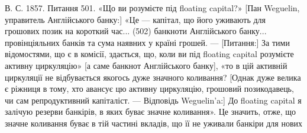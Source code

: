 В. С. 1857. Питання 501. «Що ви розумієте під floating capital?» [Пан
Weguelin, управитель Англійського банку:] «Це — капітал, що його уживають
для грошових позик на короткий час... (502) банкноти Англійського банку...
провінціяльних банків та сума наявних у країні грошей. — [Питання:] За тими
відомостями, що є в комісії, здається, що, коли ви під floating capital розумієте
активну циркуляцію» [а саме банкнот Англійського банку], «то в цій активній
циркуляції не відбувається якогось дуже значного коливання? [Однак дуже велика
є ріжниця в тому, хто авансує цю активну циркуляцію, грошовий позикодавець,
чи сам репродуктивний капіталіст. — Відповідь Weguelin’a:] До floating capital я
залічую резерви банкірів, в яких буває значне коливання». Це значить, отже, що
значне коливання буває в тій частині вкладів, що її не уживали банкіри для нових
\parbreak{}  %
